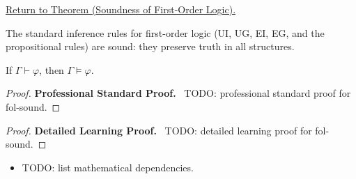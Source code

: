 \newpage
{}
\label{prf:fol-sound}

\begin{remark*}[Return]
\hyperref[thm:fol-sound]{Return to Theorem (Soundness of First-Order Logic).}
\end{remark*}

\begin{theorem*}
The standard inference rules for first-order logic (UI, UG, EI, EG, and the
propositional rules) are sound: they preserve truth in all structures.

If $\Gamma \vdash \varphi$, then $\Gamma \models \varphi$.
\end{theorem*}

\begin{proof}
\textbf{Professional Standard Proof.}~
TODO: professional standard proof for fol-sound.
\end{proof}

\begin{proof}
\textbf{Detailed Learning Proof.}~
TODO: detailed learning proof for fol-sound.
\end{proof}

\begin{remark*}
\end{remark*}

\begin{dependencies}
\begin{itemize}
  \item TODO: list mathematical dependencies.
\end{itemize}
\end{dependencies}

\clearpage

